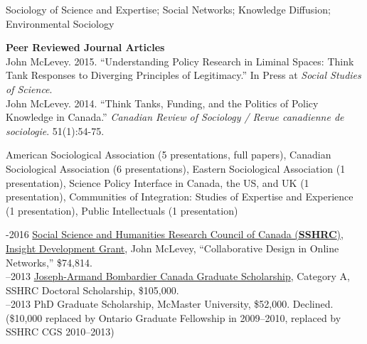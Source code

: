 \documentclass[9pt,usenames,dvipsnames]{article}
\begin{document}

\noindent Sociology of Science and Expertise; Social Networks; Knowledge Diffusion; Environmental Sociology \\


\ind \textbf{Peer Reviewed Journal Articles} \\

\ind John McLevey. 2015. ``Understanding Policy Research in Liminal Spaces: Think Tank Responses to Diverging Principles of Legitimacy.'' In Press at \emph{Social Studies of Science}. \\

\ind John McLevey. 2014. ``Think Tanks, Funding, and the Politics of Policy Knowledge in Canada.'' \emph{Canadian Review of Sociology / Revue canadienne de sociologie}. 51(1):54-75.\\


\noindent American Sociological Association (5 presentations, full papers), Canadian Sociological Association (6 presentations), Eastern Sociological Association (1 presentation), Science Policy Interface in Canada, the US, and UK (1 presentation), Communities of Integration: Studies of Expertise and Experience (1 presentation), Public Intellectuals (1 presentation)\\


-2016 \href{http://www.sshrc-crsh.gc.ca/funding-financement/programs-programmes/insight_development_grants-su
bventions_de_developpement_savoir-eng.aspx}{Social Science and Humanities Research Council of Canada (\textbf{SSHRC}), Insight Development Grant}, John McLevey, ``Collaborative Design in Online Networks,'' \$74,814. \\

–2013 \href{http://www.sshrc-crsh.gc.ca/funding-financement/programs-programmes/fellowships/doctoral-doctorat-eng.aspx}{Joseph-Armand Bombardier Canada Graduate Scholarship}, Category A, SSHRC Doctoral Scholarship, \$105,000. \\

–2013 PhD Graduate Scholarship, McMaster University, \$52,000. Declined. (\$10,000 replaced by Ontario Graduate Fellowship in 2009–2010, replaced by SSHRC CGS 2010–2013) \\
\end{document}

